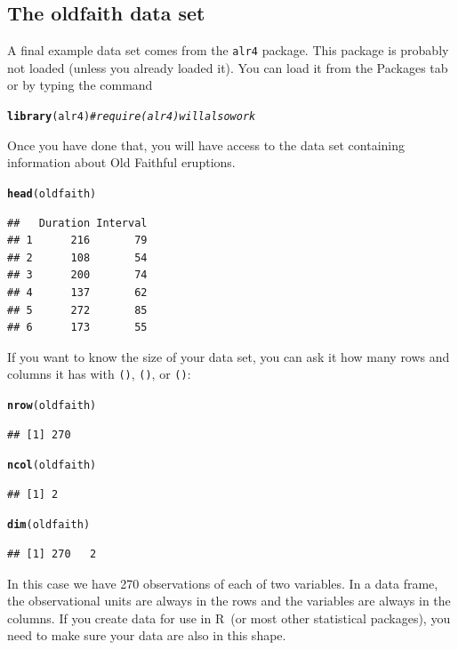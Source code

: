\documentclass[twoside]{book}\usepackage[]{graphicx}\usepackage[]{xcolor}
\makeatletter
\newcommand{\hlcom}[1]{\textcolor[rgb]{0.678,0.584,0.686}{\textit{#1}}}%
\newcommand{\hlstd}[1]{\textcolor[rgb]{0.345,0.345,0.345}{#1}}%
\newcommand{\hlkwd}[1]{\textcolor[rgb]{0.737,0.353,0.396}{\textbf{#1}}}%
\newenvironment{kframe}{%
 \def\at@end@of@kframe{}%
 \ifinner\ifhmode%
  \def\at@end@of@kframe{\end{minipage}}%
  \begin{minipage}{\columnwidth}%
 \fi\fi%
 \def\FrameCommand##1{\hskip\@totalleftmargin \hskip-\fboxsep
 \colorbox{shadecolor}{##1}\hskip-\fboxsep
     \hskip-\linewidth \hskip-\@totalleftmargin \hskip\columnwidth}%
 \MakeFramed {\advance\hsize-\width
   \@totalleftmargin\z@ \linewidth\hsize
   \@setminipage}}%
 {\par\unskip\endMakeFramed%
 \at@end@of@kframe}
\newenvironment{knitrout}{}{} %
\newcommand{\Rindex}[1]{\index{\texttt{#1}}}
\newcommand{\function}[1]{{\color{purple!75!blue}\texttt{\StrSubstitute{#1}{()}{}()}}\Rindex{#1}}
\newcommand{\pkg}[1]{{\color{red!80!black}\texttt{#1}}\Rindex{#1}}
\def\R{{\sf R}}
\def\tab#1{{\sf #1}}
\newcounter{example}[section]
\makeatother
\begin{document}
\subsection{The oldfaith data set}
A final example data set comes from the \pkg{alr4} package.  This package is probably not 
loaded (unless you already loaded it).  You can load it from the \tab{Packages} tab or
by typing the command
\begin{knitrout}
\color{fgcolor}\begin{kframe}
\begin{alltt}
\hlkwd{library}\hlstd{(alr4)}      \hlcom{# require(alr4) will also work}
\end{alltt}
\end{kframe}
\end{knitrout}
Once you have done that, you will have access to the data set containing information about
Old Faithful eruptions.
\begin{knitrout}
\color{fgcolor}\begin{kframe}
\begin{alltt}
\hlkwd{head}\hlstd{(oldfaith)}
\end{alltt}
\begin{verbatim}
##   Duration Interval
## 1      216       79
## 2      108       54
## 3      200       74
## 4      137       62
## 5      272       85
## 6      173       55
\end{verbatim}
\end{kframe}
\end{knitrout}

If you want to know the size of your data set, you can ask it how many rows and columns it has
with
\function{nrow}, \function{ncol}, or \function{dim}:
\begin{knitrout}
\color{fgcolor}\begin{kframe}
\begin{alltt}
\hlkwd{nrow}\hlstd{(oldfaith)}
\end{alltt}
\begin{verbatim}
## [1] 270
\end{verbatim}
\begin{alltt}
\hlkwd{ncol}\hlstd{(oldfaith)}
\end{alltt}
\begin{verbatim}
## [1] 2
\end{verbatim}
\begin{alltt}
\hlkwd{dim}\hlstd{(oldfaith)}
\end{alltt}
\begin{verbatim}
## [1] 270   2
\end{verbatim}
\end{kframe}
\end{knitrout}
In this case we have 270 observations of each of two variables.
In a data frame, the observational units are always in the rows and the variables
are always in the columns.  If you create data for use in \R\ (or most other 
statistical packages), you need to make sure your data are also in this shape.
\end{document}

